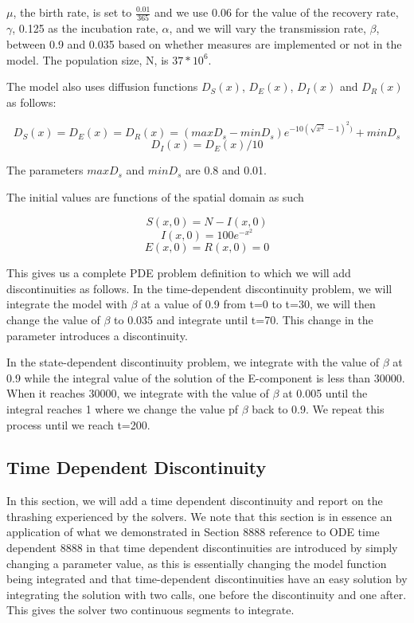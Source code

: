 \documentclass{article}
\begin{document}
$\mu$, the birth rate, is set to $\frac{0.01}{365}$ and we use 0.06 for the value of the recovery rate, $\gamma$, 0.125 as the incubation rate, $\alpha$, and we will vary the transmission rate, $\beta$, between 0.9 and 0.035 based on whether measures are implemented or not in the model. The population size, N, is $37*10^{6}$.

The model also uses diffusion functions $D_S(x)$, $D_E(x)$, $D_I(x)$ and $D_R(x)$ as follows:


\begin{equation}
D_S(x) = D_E(x) = D_R(x) = (maxD_s - minD_s)e^{-10(\sqrt{x^{2}} - 1)^2)} + minD_s
\end{equation} 
\begin{equation}
D_I(x) = D_E(x)/10
\end{equation}

The parameters $maxD_s$ and $minD_s$ are 0.8 and 0.01.

The initial values are functions of the spatial domain as such

\begin{equation}
S(x, 0) = N - I(x, 0)
\end{equation}
\begin{equation}
I(x, 0) = 100e^{-x^2}
\end{equation}
\begin{equation}
E(x, 0) = R(x, 0) = 0
\end{equation}

This gives us a complete PDE problem definition to which we will add discontinuities as follows. In the time-dependent discontinuity problem, we will integrate the model with $\beta$ at a value of 0.9 from t=0 to t=30, we will then change the value of $\beta$ to 0.035 and integrate until t=70. This change in the parameter introduces a discontinuity.

In the state-dependent discontinuity problem, we integrate with the value of $\beta$ at 0.9 while the integral value of the solution of the E-component is less than 30000. When it reaches 30000, we integrate with the value of $\beta$ at 0.005 until the integral reaches 1 where we change the value pf $\beta$ back to 0.9. We repeat this process until we reach t=200.

\subsection{Time Dependent Discontinuity}
In this section, we will add a time dependent discontinuity and report on the thrashing experienced by the solvers. We note that this section is in essence an application of what we demonstrated in Section 8888 reference to ODE time dependent 8888 in that time dependent discontinuities are introduced by simply changing a parameter value, as this is essentially changing the model function being integrated and that time-dependent discontinuities have an easy solution by integrating the solution with two calls, one before the discontinuity and one after. This gives the solver two continuous segments to integrate.
\end{document}
